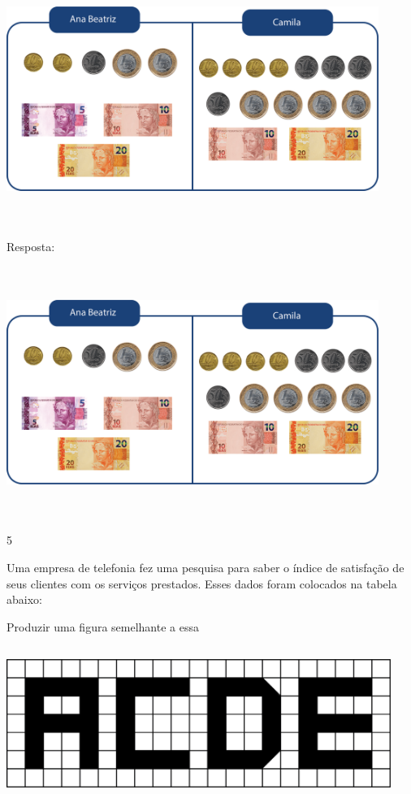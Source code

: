 \begin{escolha}
\includegraphics[width=4.76708in,height=3.21695in]{media/image95.png}

Resposta:

\includegraphics[width=4.76708in,height=3.21695in]{media/image95.png}

\num{5}

Uma empresa de telefonia fez uma pesquisa para saber o índice de
satisfação de seus clientes com os serviços prestados. Esses dados foram
colocados na tabela abaixo:

Produzir uma figura semelhante a essa

\includegraphics[width=4.92543in,height=1.97517in]{media/image96.png}


\end{escolha}
